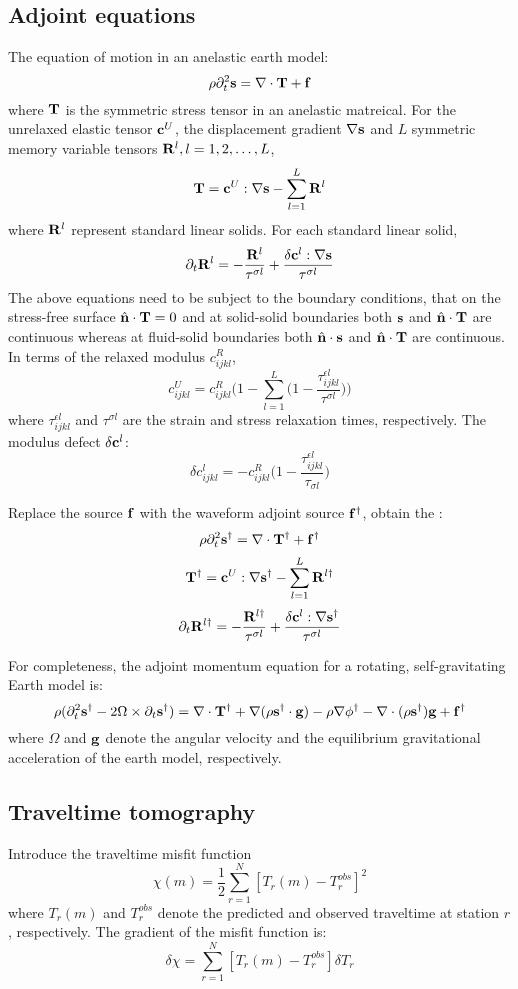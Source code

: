 \subsection{Adjoint equations}
The equation of motion in an anelastic earth model:
\[ \rho\partial_t^2\mathbf{s}=\nabla\cdot\mathbf{T}+\mathbf{f} \]
where $\mathbf{T}$ is the symmetric stress tensor in an anelastic matreical. For the unrelaxed elastic tensor $\mathbf{c}^U$, the displacement gradient $\nabla\mathbf{s}$ and $L$ symmetric memory variable tensors $\mathbf{R}^l,l=1,2,\ldots,L$,
\[ \mathbf{T}=\mathbf{c}^U:\nabla\mathbf{s}-\sum_{l=1}^L\mathbf{R}^l \]
where $\mathbf{R}^l$ represent standard linear solids. For each standard linear solid,
\[ \partial_t\mathbf{R}^l=-\frac{\mathbf{R}^l}{\tau^{\sigma l}}+\frac{\delta\mathbf{c}^l:\nabla\mathbf{s}}{\tau^{\sigma l}} \]
The above equations need to be subject to the boundary conditions, that on the stress-free surface $\hat{\mathbf{n}}\cdot\mathbf{T}=0$ and at solid-solid boundaries both $\mathbf{s}$ and $\hat{\mathbf{n}}\cdot\mathbf{T}$ are continuous whereas at fluid-solid boundaries both $\hat{\mathbf{n}}\cdot\mathbf{s}$ and $\hat{\mathbf{n}}\cdot\mathbf{T}$ are continuous. In terms of the relaxed modulus $c_{ijkl}^R$,
\[ c_{ijkl}^U=c_{ijkl}^R\bigg(1-\sum_{l=1}^L\Big(1-\frac{\tau_{ijkl}^{\epsilon l}}{\tau^{\sigma l}}\Big)\bigg) \]
where $\tau_{ijkl}^{\epsilon l}$ and $\tau^{\sigma l}$ are the strain and stress relaxation times, respectively. The modulus defect $\delta\mathbf{c}^l$:
\[ \delta c_{ijkl}^l=-c_{ijkl}^R\Big(1-\frac{\tau_{ijkl}^{\epsilon l}}{\tau_{\sigma l}}\Big) \]\par
Replace the source $\mathbf{f}$ with the waveform adjoint source $\mathbf{f}^\dagger$, obtain the :
\[ \rho\partial_t^2\mathbf{s}^\dagger=\nabla\cdot\mathbf{T}^\dagger+\mathbf{f}^\dagger \]
\[ \mathbf{T}^\dagger=\mathbf{c}^U:\nabla\mathbf{s}^\dagger-\sum_{l=1}^L\mathbf{R}^{l\dagger} \]
\[ \partial_t\mathbf{R}^{l\dagger}=-\frac{\mathbf{R}^{l\dagger}}{\tau^{\sigma l}}+\frac{\delta\mathbf{c}^l:\nabla\mathbf{s}^\dagger}{\tau^{\sigma l}} \]\par
For completeness, the adjoint momentum equation for a rotating, self-gravitating Earth model is:
\[ \rho(\partial_t^2\mathbf{s}^\dagger-2\Omega\times\partial_t\mathbf{s}^\dagger)=\nabla\cdot\mathbf{T}^\dagger+\nabla(\rho\mathbf{s}^\dagger\cdot\mathbf{g})-\rho\nabla\phi^\dagger-\nabla\cdot(\rho\mathbf{s}^\dagger)\mathbf{g}+\mathbf{f}^\dagger \]
where $\Omega$ and $\mathbf{g}$ denote the angular velocity and the equilibrium gravitational acceleration of the earth model, respectively.\par
\subsection{Traveltime tomography}
Introduce the traveltime misfit function
\[ \chi(m)=\frac{1}{2}\sum_{r=1}^N[T_r(m)-T_r^{obs}]^2 \]
where $T_r(m)$ and $T_r^{obs}$ denote the predicted and observed traveltime at station $r$, respectively. The gradient of the misfit function is:
\[ \delta\chi=\sum_{r=1}^N[T_r(m)-T_r^{obs}]\delta T_r \]\par
